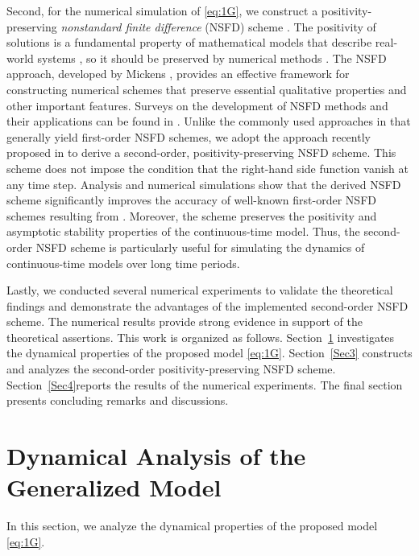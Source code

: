 \documentclass[11pt]{article}
\theoremstyle{definition}
\theoremstyle{remark}
\numberwithin{equation}{section}
\begin{document}
Second, for the numerical simulation of \eqref{eq:1G}, we construct a positivity-preserving \textit{nonstandard finite difference} (NSFD) scheme \cite{Mickens1, Mickens2, Mickens3, Mickens4, Mickens5}. 
The positivity of solutions is a fundamental property of mathematical models that describe real-world systems \cite{Allen, Brauer, Martcheva, Smith},
so it should be preserved by numerical methods \cite{Ascher, Horvath, Stuart}.
The NSFD approach, developed by Mickens \cite{Mickens1, Mickens2, Mickens3, Mickens4, Mickens5},
provides an effective framework for constructing numerical schemes that preserve essential qualitative properties and other important features. 
Surveys on the development of NSFD methods and their applications can be found in \cite{HoangMatthias, Patidar1, Patidar2}. 
Unlike the commonly used approaches in \cite{Cresson, Dimitrov3, Wood0, Wood1} that generally yield first-order NSFD schemes, 
we adopt the approach recently proposed in \cite{HoangMatthias2026} to derive a second-order, positivity-preserving NSFD scheme. 
This scheme does not impose the condition that the right-hand side function vanish at any time step. 
Analysis and numerical simulations show that the derived NSFD scheme significantly improves the accuracy of well-known first-order NSFD schemes resulting from \cite{Cresson, Dimitrov3, Wood0, Wood1}.
Moreover, the scheme preserves the positivity and asymptotic stability properties of the continuous-time model. 
Thus, the second-order NSFD scheme is particularly useful for simulating the dynamics of continuous-time models over long time periods.

Lastly, we conducted several numerical experiments to validate the theoretical findings and demonstrate the advantages of the implemented second-order NSFD scheme. 
The numerical results provide strong evidence in support of the theoretical assertions.
%
This work is organized as follows.
Section~\ref{Sec2} investigates the dynamical properties of the proposed model \eqref{eq:1G}. 
Section~\ref{Sec3} constructs and analyzes the second-order positivity-preserving NSFD scheme.
Section~\ref{Sec4}reports the results of the numerical experiments. 
The final section presents concluding remarks and discussions.



\section{Dynamical Analysis of the Generalized Model}\label{Sec2}
In this section, we analyze the dynamical properties of the proposed model \eqref{eq:1G}.
\end{document}
